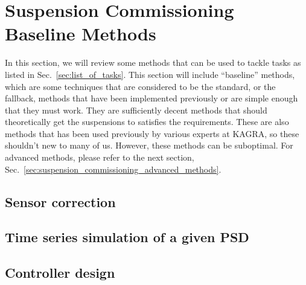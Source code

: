 \section{Suspension Commissioning Baseline Methods \label{sec:suspension_commissioning_baseline_methods}}
In this section, we will review some methods that can be used to tackle tasks as listed in Sec.~\ref{sec:list_of_tasks}.
This section will include ``baseline'' methods, which are some techniques that are considered to be the standard, or the fallback, methods that have been implemented previously or are simple enough that they must work.
They are sufficiently decent methods that should theoretically get the suspensions to satisfies the requirements.
These are also methods that has been used previously by various experts at KAGRA, so these shouldn't new to many of us.
However, these methods can be suboptimal.
For advanced methods, please refer to the next section, Sec.~\ref{sec:suspension_commissioning_advanced_methods}.







\subsection{Sensor correction \label{sec:sensor_correction}}
\subsection{Time series simulation of a given PSD}
\subsection{Controller design}

